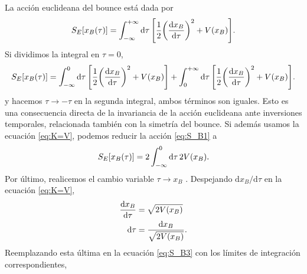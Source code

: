 La acción euclideana del bounce está dada por %
\begin{equation}\label{eq:S_B1}
S_E\qty[x_B\qty(\tau)] =  \int_{-\infty}^{+\infty} \dd{\tau} \qty[ \frac{1}{2}\qty(\dv{x_B}{\tau})^2 + V\qty(x_B) ]. 
\end{equation}
Si dividimos la integral en $\tau = 0$,
\begin{equation}\label{eq:S_B_tau0}
S_E\qty[x_B\qty(\tau)] =  \int_{-\infty}^{0} \dd{\tau} \qty[ \frac{1}{2}\qty(\dv{x_B}{\tau})^2 + V\qty(x_B) ] +   \int_{0}^{+\infty} \dd{\tau} \qty[ \frac{1}{2}\qty(\dv{x_B}{\tau})^2 + V\qty(x_B) ]. 
\end{equation}
y hacemos $\tau \rightarrow -\tau$ en la segunda integral, ambos términos son iguales. %
Esto es una consecuencia directa de la invariancia de la acción euclideana ante inversiones temporales, relacionada también con la simetría del bounce. Si además usamos la ecuación \eqref{eq:K=V}, podemos reducir la acción \eqref{eq:S_B1} a
\begin{equation} \label{eq:S_B3}
S_E\qty[x_B\qty(\tau)] = 2\int_{-\infty}^{0} \dd{\tau} 2 V\qty(x_B).
\end{equation}
Por último, realicemos el cambio variable $\tau \rightarrow x_B$ \cite{rubakov2009classical}. Despejando $\text{d}x_B/\text{d}\tau$ en la ecuación \eqref{eq:K=V}, %
\begin{align}
\dv{x_B}{\tau} &= \sqrt{2V\qty(x_B)} \\  \label{eq:dtau}
\dd{\tau} &= \frac{\dd{x_B}}{\sqrt{2V(x_B)}}.
\end{align}
Reemplazando esta última %
en la ecuación \eqref{eq:S_B3} con los límites de integración correspondientes,

